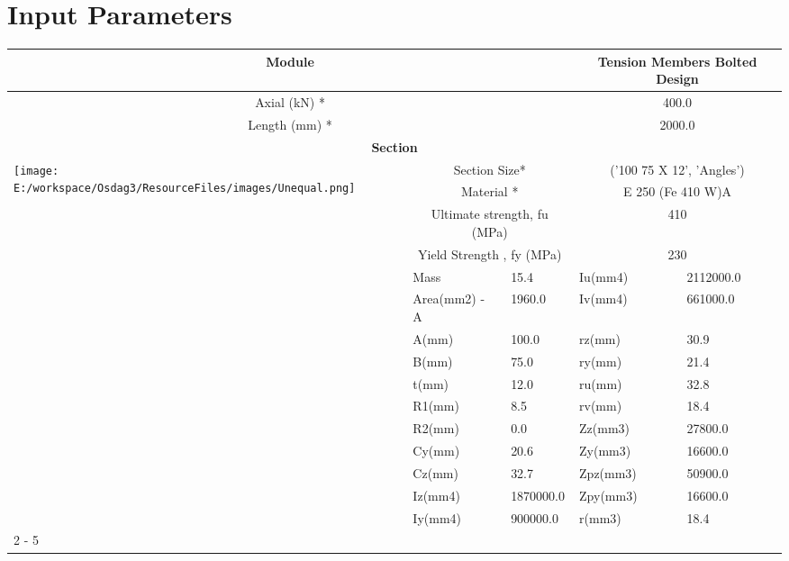 \documentclass{article}%
\begin{document}
%
\normalsize%
\pagestyle{header}%
\section{Input Parameters}%
\label{sec:InputParameters}%
\renewcommand{\arraystretch}{1.2}%
\begin{longtable}{|p{5cm}|p{2cm}|p{2cm}|p{2cm}|p{5cm}|}%
\hline%
\hline%
\multicolumn{3}{|c|}{Module}&\multicolumn{2}{|c|}{Tension Members Bolted Design}\\%
\hline%
\hline%
\multicolumn{3}{|c|}{Axial (kN) *}&\multicolumn{2}{|c|}{400.0}\\%
\hline%
\hline%
\multicolumn{3}{|c|}{Length (mm) *}&\multicolumn{2}{|c|}{2000.0}\\%
\hline%
\hline%
\multicolumn{5}{|c|}{\textbf{Section}}\\%
\hline%
\hline%
\multirow{15}{*}{\texttt{[image: E:/workspace/Osdag3/ResourceFiles/images/Unequal.png]}}&\multicolumn{2}{|c|}{Section Size*}&\multicolumn{2}{|c|}{('100 75 X 12', 'Angles')}\\%
\cline{2%
-%
5}%
&\multicolumn{2}{|c|}{Material *}&\multicolumn{2}{|c|}{E 250 (Fe 410 W)A}\\%
\cline{2%
-%
5}%
&\multicolumn{2}{|c|}{Ultimate strength, fu (MPa)}&\multicolumn{2}{|c|}{410}\\%
\cline{2%
-%
5}%
&\multicolumn{2}{|c|}{Yield Strength , fy (MPa)}&\multicolumn{2}{|c|}{230}\\%
\cline{2%
-%
5}%
&Mass&15.4&Iu(mm4)&2112000.0\\%
\cline{2%
-%
5}%
&Area(mm2) {-} A&1960.0&Iv(mm4)&661000.0\\%
\cline{2%
-%
5}%
&A(mm)&100.0&rz(mm)&30.9\\%
\cline{2%
-%
5}%
&B(mm)&75.0&ry(mm)&21.4\\%
\cline{2%
-%
5}%
&t(mm)&12.0&ru(mm)&32.8\\%
\cline{2%
-%
5}%
&R1(mm)&8.5&rv(mm)&18.4\\%
\cline{2%
-%
5}%
&R2(mm)&0.0&Zz(mm3)&27800.0\\%
\cline{2%
-%
5}%
&Cy(mm)&20.6&Zy(mm3)&16600.0\\%
\cline{2%
-%
5}%
&Cz(mm)&32.7&Zpz(mm3)&50900.0\\%
\cline{2%
-%
5}%
&Iz(mm4)&1870000.0&Zpy(mm3)&16600.0\\%
\cline{2%
-%
5}%
&Iy(mm4)&900000.0&r(mm3)&18.4\\%
\cline{2%
-%
5}%
\hline%
\multicolumn{5}{|c|}{\textbf{Bolt Details}}\\%

\end{longtable}
\end{document}
